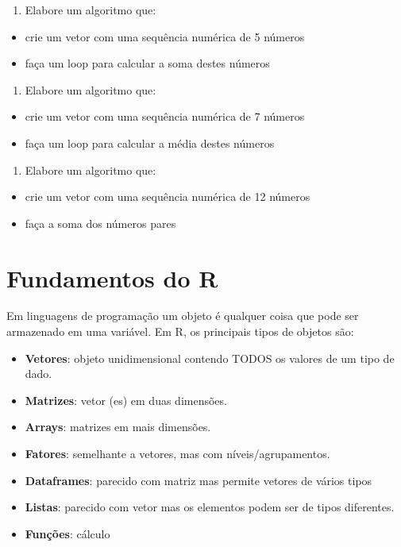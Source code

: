 \documentclass[
]{book}
\providecommand{\tightlist}{%
  \setlength{\itemsep}{0pt}\setlength{\parskip}{0pt}}
\begin{document}
\begin{enumerate}
\def\labelenumi{\arabic{enumi}.}
\setcounter{enumi}{3}
\tightlist
\item
  Elabore um algoritmo que:
\end{enumerate}

\begin{itemize}
\tightlist
\item
  crie um vetor com uma sequência numérica de 5 números
\item
  faça um loop para calcular a soma destes números
\end{itemize}

\begin{enumerate}
\def\labelenumi{\arabic{enumi}.}
\setcounter{enumi}{4}
\tightlist
\item
  Elabore um algoritmo que:
\end{enumerate}

\begin{itemize}
\tightlist
\item
  crie um vetor com uma sequência numérica de 7 números
\item
  faça um loop para calcular a média destes números
\end{itemize}

\begin{enumerate}
\def\labelenumi{\arabic{enumi}.}
\setcounter{enumi}{5}
\tightlist
\item
  Elabore um algoritmo que:
\end{enumerate}

\begin{itemize}
\tightlist
\item
  crie um vetor com uma sequência numérica de 12 números
\item
  faça a soma dos números pares
\end{itemize}

\hypertarget{fundamentos-do-r}{%
\chapter{Fundamentos do R}\label{fundamentos-do-r}}

Em linguagens de programação um objeto é qualquer coisa que pode ser armazenado em uma variável. Em R, os principais tipos de objetos são:

\begin{itemize}
\tightlist
\item
  \textbf{Vetores}: objeto unidimensional contendo TODOS os valores de um tipo de dado.
\item
  \textbf{Matrizes}: vetor (es) em duas dimensões.
\item
  \textbf{Arrays}: matrizes em mais dimensões.
\item
  \textbf{Fatores}: semelhante a vetores, mas com níveis/agrupamentos.
\item
  \textbf{Dataframes}: parecido com matriz mas permite vetores de vários tipos
\item
  \textbf{Listas}: parecido com vetor mas os elementos podem ser de tipos diferentes.
\item
  \textbf{Funções}: cálculo
\end{itemize}
\end{document}
